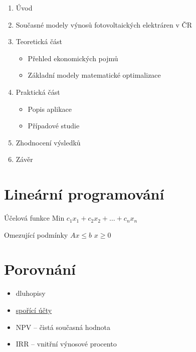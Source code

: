\documentclass[12pt, aspectratio=169]{beamer} %
\begin{document}
\begin{frame}{\insertsection}
    \begin{enumerate}
        \item Úvod
        \item Současné modely výnosů fotovoltaických elektráren v ČR
        \item Teoretická část
        \begin{itemize}
            \item Přehled ekonomických pojmů
            \item Základní modely matematické optimalizace
        \end{itemize}
        \item Praktická část
        \begin{itemize}
            \item Popis aplikace
            \item Případové studie
        \end{itemize}
        \item Zhodnocení výsledků
        \item Závěr
        
    \end{enumerate}
\end{frame}

\section{Lineární programování}

    \begin{frame}{\insertsection}
    \begin{block}{Účelová funkce}
        \vspace{10pt}
        \centering
        Min $c_1x_1 + c_2x_2 + \ldots + c_nx_n$
    \end{block}

    \begin{block}{Omezující podmínky}
        \vspace{10pt}
        \centering
        $Ax \leq b$
        \break
        $x \geq 0$
    \end{block}

    \end{frame}

\section{Porovnání}

\begin{frame}{\insertsection}
    \begin{itemize}
        \item dluhopisy
        \item \href{https://www.mesec.cz/produkty/sporici-ucty/}{spořící účty}
        \item NPV – čistá současná hodnota
        \item IRR – vnitřní výnosové procento
    \end{itemize}

\end{frame}
\end{document}
